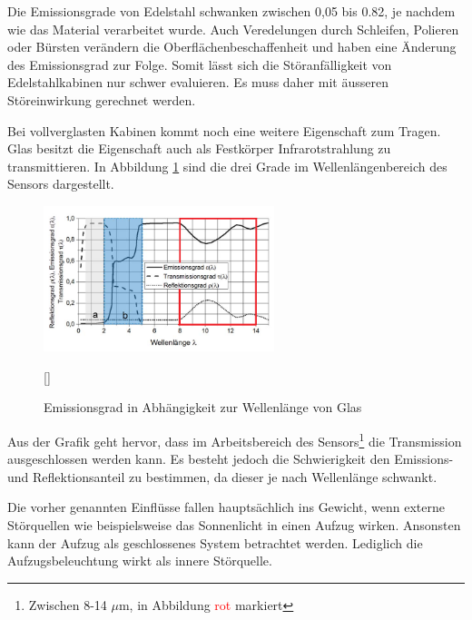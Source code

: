 Die Emissionsgrade von Edelstahl schwanken zwischen 0,05 bis 0.82, je nachdem wie das Material verarbeitet wurde. Auch Veredelungen durch Schleifen, Polieren oder Bürsten verändern die Oberflächenbeschaffenheit und haben eine Änderung des Emissionsgrad zur Folge. Somit lässt sich die Störanfälligkeit von Edelstahlkabinen nur schwer evaluieren. Es muss daher mit äusseren Störeinwirkung gerechnet werden. 

Bei vollverglasten Kabinen kommt noch eine weitere Eigenschaft zum Tragen. Glas besitzt die Eigenschaft auch als Festkörper Infrarotstrahlung zu transmittieren. In Abbildung \ref{fig:Glas} sind die drei Grade im  Wellenlängenbereich des Sensors dargestellt. 

\begin{figure}[H]
	\centering
	\includegraphics[width=0.6\textwidth]
	{fig/Glas_bearbeitet.png}
	\caption[Emissionsgrad in Abhängikeit zur Wellenlänge von Glas]{Emissionsgrad in Abhängigkeit zur Wellenlänge von Glas}[\cite{Glas}] 
	\label{fig:Glas}	
\end{figure}

Aus der Grafik geht hervor, dass im Arbeitsbereich des Sensors\footnote[11]{Zwischen 8-14 $\mu$m, in Abbildung \textcolor{red}{rot} markiert} die Transmission ausgeschlossen werden kann. Es besteht jedoch die Schwierigkeit den Emissions- und Reflektionsanteil zu bestimmen, da dieser je nach Wellenlänge schwankt.

Die vorher genannten Einflüsse fallen hauptsächlich ins Gewicht, wenn externe Störquellen wie beispielsweise das Sonnenlicht in einen Aufzug wirken. Ansonsten kann der Aufzug als geschlossenes System betrachtet werden. Lediglich die Aufzugsbeleuchtung wirkt als innere Störquelle.

